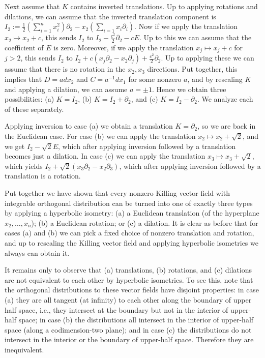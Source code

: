 \documentclass[12pt]{article}
\numberwithin{lemma}{section}
\begin{document}
{Next assume that $K$ contains inverted translations.  Up to applying rotations and dilations, we can assume that the inverted translation component is $I_2 := \frac{1}{2}(\sum_{i=1}^nx_i^2)\partial_2-x_2(\sum_{i=1}x_i\partial_i)$. Now if we apply the translation $x_2 \mapsto x_2 + c$, this sends $I_2$
to $I_2 - \frac{c^2}{2} \partial_2 - c E$. Up to this we can assume that the coefficient of $E$ is zero.  Moreover, if we apply the translation $x_j \mapsto x_j + c$ for $j > 2$, this sends $I_2$ to $I_2 + c(x_j \partial_2 - x_2 \partial_j) + \frac{c^2}{2} \partial_2$.  Up to applying these we can assume that there is no rotation in the $x_2,x_3$ directions.  Put together, this implies that $D=adx_2$ and $C=a^{-1} dx_1$ for some nonzero $a$, and by rescaling $K$ and applying a dilation, we can assume $a=\pm 1$.  Hence we obtain three possibilities: (a) $K=I_2$, (b) $K=I_2+\partial_2$, and (c) $K=I_2-\partial_2$. We analyze each of these separately.

Applying inversion to case (a) we obtain a translation $K=\partial_2$, so we are back in the Euclidean case.  For case (b) we can apply the translation $x_2 \mapsto x_2 + \sqrt{2}$,  and we get $I_2 - \sqrt{2} E$, which after applying inversion followed by a translation becomes just a dilation.  In case (c) we can apply the translation $x_3 \mapsto x_3 + \sqrt{2}$, which yields $I_2+\sqrt{2} (x_3 \partial_2 - x_2 \partial_3)$, which after applying inversion followed by a translation is a rotation.  

Put together we have shown that every nonzero Killing vector field with integrable orthogonal distribution can be turned into one of exactly three types by applying a hyperbolic isometry: (a) a Euclidean translation (of the hyperplane $x_2, \ldots, x_n$); (b) a Euclidean rotation; or (c) a dilation.  It is clear as before that for cases (a) and (b) we can pick a fixed choice of nonzero translation and rotation, and up to rescaling the Killing vector field and applying hyperbolic isometries we always can obtain it.

It remains only to observe that (a) translations, (b) rotations, and (c) dilations are not equivalent to each other by hyperbolic isometries.  To see this, note that the orthogonal distributions to these vector fields have disjoint properties: in case (a) they are all tangent (at infinity) to each other along the boundary of upper half space, i.e., they intersect at the boundary but not in the interior of upper-half space; in case (b) the distributions all intersect in the interior of upper-half space (along a codimension-two plane); and in case (c) the distributions do not intersect in the interior or the boundary of upper-half space.  Therefore they are inequivalent.


}
\end{document}
